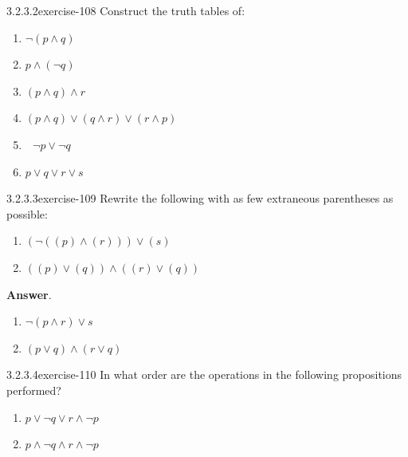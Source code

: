 \documentclass[twoside,10pt,]{book}
\numberwithin{equation}{section}
\begin{document}
\begin{divisionsolution}{3.2.3.2}{}{exercise-108}%
\hypertarget{p-968}{}%
Construct the truth tables of:\leavevmode%
\begin{multicols}{2}
\begin{enumerate}[label=(\alph*)]
\item\hypertarget{li-543}{}\hypertarget{p-969}{}%
\(\neg (p\land  q )\)%
\item\hypertarget{li-544}{}\hypertarget{p-970}{}%
\(p \land  (\neg q)\)%
\item\hypertarget{li-545}{}\hypertarget{p-971}{}%
\((p \land q)\land r\)%
\item\hypertarget{li-546}{}\hypertarget{p-972}{}%
\((p \land q) \lor (q \land r)\lor (r \land  p)\)%
\item\hypertarget{li-547}{}\hypertarget{p-973}{}%
\(\text{  }\neg  p\lor  \neg q\)%
\item\hypertarget{li-548}{}\hypertarget{p-974}{}%
\(p \lor  q \lor  r \lor s\)%
\end{enumerate}
\end{multicols}
%
\end{divisionsolution}%
\begin{divisionsolution}{3.2.3.3}{}{exercise-109}%
\hypertarget{p-975}{}%
Rewrite the following with as few extraneous parentheses as possible:\leavevmode%
\begin{multicols}{2}
\begin{enumerate}[label=(\alph*)]
\item\hypertarget{li-549}{}\hypertarget{p-976}{}%
\((\neg ((p) \land  (r))) \lor  (s)\)%
\item\hypertarget{li-550}{}\hypertarget{p-977}{}%
\(((p) \lor  (q)) \land  ((r) \lor  (q))\)%
\end{enumerate}
\end{multicols}
%
\par\smallskip%
\noindent\textbf{Answer}.\quad%
\hypertarget{p-978}{}%
\leavevmode%
\begin{enumerate}[label=(\alph*)]
\item\hypertarget{li-551}{}\hypertarget{p-979}{}%
\(\neg (p\land r) \lor  s\)%
\item\hypertarget{li-552}{}\hypertarget{p-980}{}%
\((p\lor q) \land  (r\lor q)\)%
\end{enumerate}
%
\end{divisionsolution}%
\begin{divisionsolution}{3.2.3.4}{}{exercise-110}%
\hypertarget{p-981}{}%
In what order are the operations in the following propositions performed?\leavevmode%
\begin{multicols}{2}
\begin{enumerate}[label=(\alph*)]
\item\hypertarget{li-553}{}\hypertarget{p-982}{}%
\(p \lor  \neg q \lor  r\land  \neg p\)%
\item\hypertarget{li-554}{}\hypertarget{p-983}{}%
\(p \land  \neg  q \land  r \land  \neg  p\)%
\end{enumerate}
\end{multicols}
%
\end{divisionsolution}%
\end{document}
